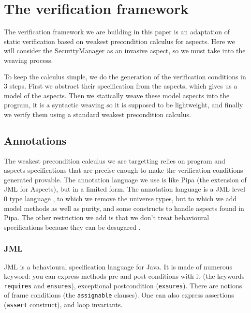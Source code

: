 \documentclass[draft]{llncs}
\begin{document}
\section{The verification framework}
The verification framework we are building in this paper is an adaptation of static
verification based on weakest precondition calculus for aspects. Here we will consider
the SecurityManager as an invasive aspect, so we must take into the weaving process.

To keep the calculus simple, we do the generation of the verification conditions in 3 steps.
First we abstract their specification from the aspects, which gives us a model of the aspects.
Then we statically weave these model aspects into the program, it is a syntactic weaving so
it is supposed to be lightweight, and finally we verify them
using a standard weakest precondition calculus.

\subsection{Annotations}
The weakest precondition calculus we are targetting relies on program and aspects specifications that are
precise enough to make the verification conditions generated provable.
The annotation language we use is like Pipa \cite{ZhaoR03} (the extension
of JML for Aspects), but in a limited form. The annotation language is a JML level 0 type language 
\cite{Leavens-etal07}, to which
we remove the universe types, but to which we add model methods as well as purity, and some constructs
to handle aspects found in Pipa. The other restriction we add is that we don't treat behavioural specifications
because they can be desugared \cite{RaghavanL00}.

\subsubsection{JML} JML is a behavioural specification language for Java. It is made of numerous keyword: you 
can express methods pre and post conditions with it (the keywords {\tt requires} and {\tt ensures}), exceptional
postcondition ({\tt exsures}). There
are notions of frame conditions (the {\tt assignable} clauses). One can also express assertions ({\tt assert} 
construct), and loop invariants.
\end{document}
